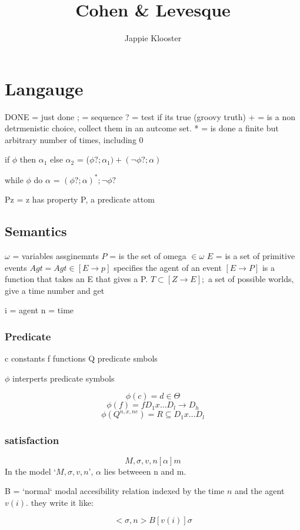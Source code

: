 \documentclass{article}
\begin{document}
\author{Jappie Klooster}
\title{Cohen \& Levesque}
\maketitle
\section{Langauge}
DONE = just done
; = sequence
? = test if its true (groovy truth)
+ = is a non detrmenistic choice, collect them in an autcome set.
* = is done a finite but arbitrary number of times, including 0

if $\phi$ then $\alpha_1$ else
$\alpha_2$ = ($\phi? ; \alpha_1) + (\neg \phi?;\alpha)$

while $\phi$ do $\alpha$ = $(\phi?;\alpha)^*;\neg\phi?$

Pz = z has property P, a predicate attom


\subsection{Semantics}
$\omega$ = variables assginemnts
$P$ = is the set of omega $\in \omega$
$E$ = is a set of primitive events
$Agt = Agt \in [E \to p]$ specifies the agent of an event $[E \to P]$ is a
function that takes an E that gives a P.
$T \subset [Z \to E];$ a set of possible worlds, give a time number and get

i = agent
n = time

\subsubsection{Predicate}
c constants
f functions
Q predicate smbols


$\phi$ interperts predicate symbols

\[\phi(c) = d \in \Theta\]
\[\phi(f) = f D_1x\dots D_l \to D_h\]
\[\phi(Q^{n,x,ne}) = R \subseteq D_1x\dots D_l \]

\subsubsection{satisfaction}

\[M,\sigma,v,n[\alpha] m\]
In the model `$M,\sigma,v,n$', $\alpha$ lies betweeen n and m.

B = `normal` modal accesibility relation indexed by the time $n$
and the agent $v(i)$. they write it like:

\[<\sigma, n>B[v(i)] \sigma\]
\end{document}
